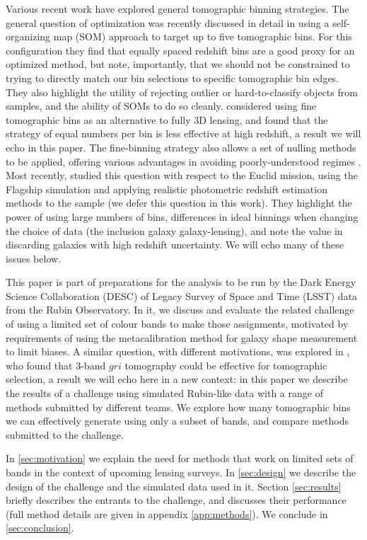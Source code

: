 \documentclass[twocolumn,twocolappendix]{aastex63}
\begin{document}
Various recent work have explored general tomographic binning strategies. The general question of optimization
was recently discussed in detail
in \citet{rainbow} using a self-organizing map (SOM) approach to target up to five tomographic bins.  For this
configuration they find that equally spaced redshift bins are a good proxy
for an optimized method, but note, importantly, that we should not be constrained to trying to directly
match our bin selections to specific tomographic bin edges. 
They also highlight the utility of rejecting outlier or hard-to-classify objects from samples, and the ability of SOMs
to do so cleanly.
\citet{taylor18} considered using
fine tomographic bins as an alternative to fully 3D lensing, and found that the strategy of equal numbers
per bin is less effective at high redshift, a result we will echo in this paper. The fine-binning strategy
also allows a set of nulling methods to be applied, offering various advantages in avoiding poorly-understood
regimes \citep{taylor18b,bnt,xcut}.
Most recently, \citet{euclid-nz} studied this question with respect to the Euclid mission, using the Flagship
simulation \citep{euclid-flagship} and applying realistic photometric redshift estimation methods to the
sample (we defer this question in this work). They highlight the power of using large numbers of bins,
differences in ideal binnings when
changing the choice of data (the inclusion galaxy galaxy-lensing), and
note the value in discarding galaxies with high redshift uncertainty. We will echo many of these issues below.

This paper is part of preparations for the analysis to be run by the Dark Energy Science Collaboration (DESC) of Legacy Survey of Space and Time (LSST) data from the Rubin Observatory.
In it, we discuss and evaluate the related challenge
of using a limited set of colour bands to make those assignments, motivated by requirements of using the
metacalibration method for galaxy shape measurement to limit biases.  
A similar question, with different motivations, was explored in \citet{jain}, who found that 3-band 
$gri$ tomography could be effective for tomographic selection, a result we will echo here in a new context: in this paper we describe the results of a 
challenge using simulated Rubin-like data with a range of methods submitted by different teams.  We explore how many tomographic bins we can effectively generate using only a subset of bands, and compare methods submitted to the challenge.

In \autoref{sec:motivation} we explain the need for methods that work on limited sets of bands in the context of upcoming lensing surveys. In \autoref{sec:design} we describe the design of the challenge and the simulated data used in it.
Section \ref{sec:results} briefly describes the entrants to the challenge, and discusses their performance (full
method details are given in appendix \ref{app:methods}).
 We conclude in \autoref{sec:conclusion}.
\end{document}
